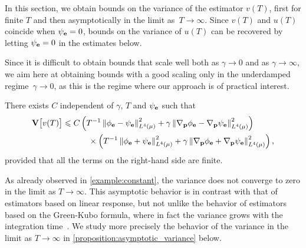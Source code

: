\documentclass[11pt,a4paper]{article}
\begin{document}
In this section, we obtain bounds on the variance of the estimator $v(T)$,
first for finite $T$ and then asymptotically in the limit as~$T \to \infty$.
Since $v(T)$ and $u(T)$ coincide when $\psi_{\boldsymbol{\mathbf e}} = 0$,
bounds on the variance of $u(T)$ can be recovered by letting $\psi_{\boldsymbol{\mathbf e}} = 0$ in the estimates below.


Since it is difficult to obtain bounds that scale well both as $\gamma \to 0$ and as $\gamma \to \infty$,
we aim here at obtaining bounds with a good scaling only in the underdamped regime~$\gamma \to 0$,
as this is the regime where our approach is of practical interest.

\begin{proposition}
    \label{proposition:variance}
    There exists $C$ independent of $\gamma$, $T$ and $\psi_{\boldsymbol{\mathbf e}}$ such that
    \begin{equation}
        \label{eq:statement_variance}
        \begin{aligned}[b]
            \var \bigl[v(T)\bigr]
            \leq
            C &\left( T^{-1} \norm{\phi_{\vect e} - \psi_{\vect e}}[L^4(\mu)]^2  + \gamma \norm{\grad_{\vect p} \phi_{\vect e} - \grad_{\vect p} \psi_{\vect e}}[L^4(\mu)]^2 \right) \\
              &\quad \times \left( T^{-1} \norm{\phi_{\vect e} + \psi_{\vect e}}[L^4(\mu)]^2  + \gamma \norm{\grad_{\vect p} \phi_{\vect e} + \grad_{\vect p} \psi_{\vect e}}[L^4(\mu)]^2 \right),
        \end{aligned}
    \end{equation}
    provided that all the terms on the right-hand side are finite.
\end{proposition}
\begin{remark}
    As already observed in \cref{example:constant},
    the variance does not converge to zero in the limit as $T \to \infty$.
    This asymptotic behavior is in contrast with that of estimators based on linear response,
    but not unlike the behavior of estimators based on the Green-Kubo formula,
    where in fact the variance grows with the integration time~\cite{LMS16}.
    We study more precisely the behavior of the variance in the limit as $T \to \infty$ in \cref{proposition:asymptotic_variance} below.
\end{remark}
\end{document}
